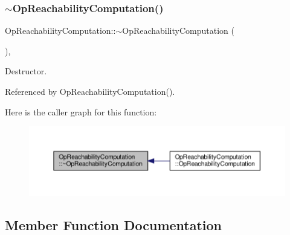 \subsubsection{\texorpdfstring{$\sim$\+Op\+Reachability\+Computation()}{~OpReachabilityComputation()}}
{\footnotesize\ttfamily Op\+Reachability\+Computation\+::$\sim$\+Op\+Reachability\+Computation (\begin{DoxyParamCaption}{ }\end{DoxyParamCaption})\hspace{0.3cm}{\ttfamily [override]}, {\ttfamily [default]}}



Destructor. 



Referenced by Op\+Reachability\+Computation().

Here is the caller graph for this function\+:
\nopagebreak
\begin{figure}[H]
\begin{center}
\leavevmode
\includegraphics[width=350pt]{dc/df4/classOpReachabilityComputation_a69178b27ad4de132945101c219f92f8e_icgraph}
\end{center}
\end{figure}


\subsection{Member Function Documentation}
\mbox{\label{classOpReachabilityComputation_a27d746a81ee9baa814405b99ef003131}} 
